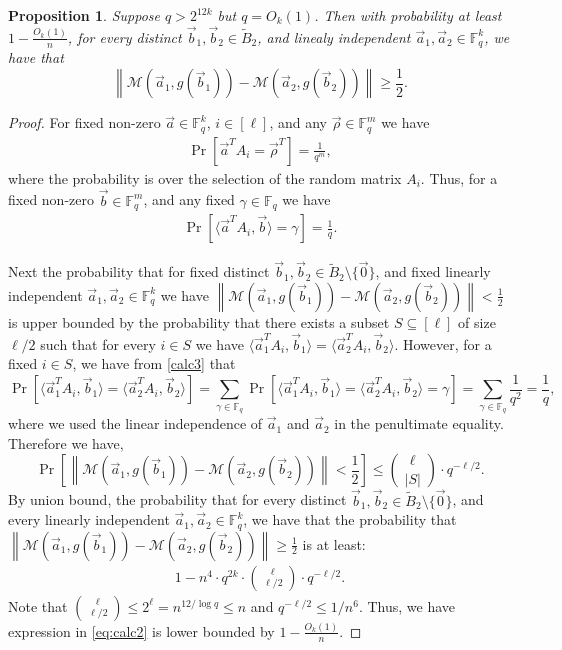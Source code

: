 \documentclass[11pt]{article}
\newcommand{\F}{\mathbb{F}}
\renewcommand{\ge}{ \geqslant}
\renewcommand{\le}{ \leqslant}
\newtheorem{proposition}[theorem]{Proposition}
\renewcommand{\tilde}{\widetilde}
\newcommand{\M}{\mathcal{M}}
\begin{document}
  
  \begin{proposition}\label{prop:collisionalphabeta}
Suppose $q>2^{12k}$ but $q=O_k(1)$. Then with probability at least $1-\frac{O_k(1)}{n}$,   for every  distinct $\vec{b}_1,\vec{b}_2\in \tilde{B}_2$, and  linealy independent $\vec{a}_1,\vec{a}_2\in\F_q^k$, we  have that  $$\left\|\M\left(\vec{a}_1,g(\vec{b}_1)\right)- \M\left(\vec{a}_2,g(\vec{b}_2)\right)\right\|\ge \frac{1}{2}.$$  
\end{proposition}  
\begin{proof}
For fixed non-zero $\vec{a}\in\F_q^k$, $i\in[\ell]$, and any $\vec{\rho}\in \F_q^m$ we have 
\begin{align}
\Pr\left[\vec{a}^T A_i=\vec{\rho}^T\right]=\frac{1}{q^m},\nonumber
\end{align}
where the probability is over the selection of the random matrix  $A_i$. Thus, for a fixed non-zero $\vec{b}\in \F_q^m$, and   any fixed $\gamma\in \F_q$ we have 
\begin{align}
\Pr\left[\langle\vec{a}^T A_i,\vec{b}\rangle=\gamma\right]=\frac{1}{q}.\label{calc3}
\end{align}

Next the probability that for fixed distinct $\vec{b}_1,\vec{b}_2\in \tilde{B}_2\setminus\{\vec{0}\}$, and fixed linearly independent $\vec{a}_1,\vec{a}_2\in\F_q^k$ we have $\left\|\M\left(\vec{a}_1,g(\vec{b}_1)\right)-\M\left(\vec{a}_2,g(\vec{b}_2)\right)\right\|< \frac{1}{2}$ is upper bounded by the probability that there exists a subset  $S\subseteq [\ell]$ of size    $\ell /2$ such  that for every $i\in S$ we have $\langle \vec{a}_1^T A_i, \vec{b}_1\rangle= \langle \vec{a}_2^T A_i, \vec{b}_2\rangle$. However, for a fixed $i\in S$, we have from \eqref{calc3} that  
$$
\Pr\left[\langle \vec{a}_1^T A_i, \vec{b}_1\rangle= \langle \vec{a}_2^T A_i, \vec{b}_2\rangle\right]=\sum_{\gamma\in\F_q}\Pr\left[\langle \vec{a}_1^T A_i, \vec{b}_1\rangle= \langle \vec{a}_2^T A_i, \vec{b}_2\rangle=\gamma\right]=\sum_{\gamma\in \F_q}\frac{1}{q^2}=\frac{1}{q},
$$
where we used the linear independence of $\vec{a}_1$ and $\vec{a}_2$ in the penultimate equality. 
Therefore we have, 
$$\Pr\left[\left\|\M\left(\vec{a}_1,g(\vec{b}_1)\right)- \M\left(\vec{a}_2,g(\vec{b}_2)\right)\right\|< \frac{1}{2}\right]\le \binom{\ell }{|S|}\cdot q^{-\ell/2}.$$
By union bound, the probability that for every    distinct $\vec{b}_1,\vec{b}_2\in \tilde{B}_2\setminus\{\vec{0}\}$, and every linearly independent $\vec{a}_1,\vec{a}_2\in\F_q^k$, we  have that the probability that $\left\|\M\left(\vec{a}_1,g(\vec{b}_1)\right)- \M\left(\vec{a}_2,g(\vec{b}_2)\right)\right\|\ge \frac{1}{2}$  is at least:
\begin{align}
   1-n^4\cdot q^{2k}\cdot\binom{\ell }{\ell /2}\cdot q^{-\ell/2}.\label{eq:calc2}
\end{align}
Note that $\binom{\ell }{\ell /2}\le 2^{\ell}=n^{12/\log q}\le n$ and $q^{-\ell /2}\le  1/n^{6}$. Thus, we have expression in \eqref{eq:calc2} is lower bounded by $1-\frac{O_k(1)}{n}$. 


\end{proof}
\end{document}
